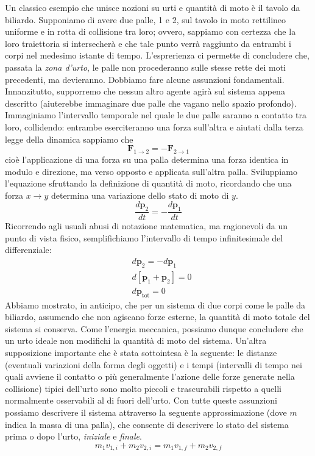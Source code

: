 Un classico esempio che unisce nozioni su urti e quantità di moto è il
tavolo da biliardo. Supponiamo di avere due palle, 1 e 2, sul tavolo in moto
rettilineo
uniforme e in rotta di collisione tra loro; ovvero, sappiamo con certezza
che la loro traiettoria si intersecherà e che tale punto verrà raggiunto
da entrambi i corpi nel medesimo istante di tempo. L'esprerienza ci permette
di concludere che, passata la \textit{zona d'urto}, le palle non procederanno
sulle stesse rette dei moti precedenti, ma devieranno.
Dobbiamo fare alcune assunzioni fondamentali. Innanzitutto, supporremo che
nessun altro agente agirà sul sistema appena descritto (aiuterebbe immaginare
due palle che vagano nello spazio profondo).
Immaginiamo l'intervallo temporale nel quale le due palle saranno a contatto
tra loro, collidendo: entrambe eserciteranno una forza sull'altra e aiutati
dalla terza legge della dinamica sappiamo che
\[ \textbf{F}_{1 \to 2} = -\textbf{F}_{2 \to 1} \]
cioè l'applicazione di una forza su una palla determina una forza identica
in modulo e direzione, ma verso opposto e applicata sull'altra palla.
Sviluppiamo l'equazione sfruttando la definizione di quantità di moto,
ricordando che una forza $x \to y$ determina una variazione dello stato di
moto di $y$.
\[ \frac{d\mathbf{p}_2}{dt} = -\frac{d\mathbf{p}_1}{dt} \]
Ricorrendo agli usuali abusi di notazione matematica, ma ragionevoli da
un punto di vista fisico, semplifichiamo l'intervallo di tempo infinitesimale
del differenziale:
\begin{align*}
    &d\mathbf{p}_2 = -d\mathbf{p}_1\\
    &d[\mathbf{p}_1 + \mathbf{p}_2] = 0\\
    &d\mathbf{p}_\text{tot} = 0
\end{align*}
Abbiamo mostrato, in anticipo, che per un sistema di due corpi come le palle
da biliardo, assumendo che non agiscano forze esterne, la quantità di moto
totale del sistema si conserva. Come l'energia meccanica, possiamo dunque
concludere che un urto ideale non modifichi la quantità di moto del sistema.
Un'altra supposizione importante che è stata
sottointesa è la seguente: le distanze (eventuali variazioni della forma
degli oggetti) e i tempi (intervalli di tempo nei quali avviene il contatto
o più generalmente l'azione delle forze generate nella collisione) tipici dell'urto sono
molto piccoli e trascurabili rispetto a quelli normalmente osservabili al
di fuori dell'urto.
Con tutte queste assunzioni possiamo descrivere il
sistema attraverso la seguente approssimazione (dove $m$ indica la massa
di una palla), che consente di descrivere lo stato del sistema prima o
dopo l'urto, \textit{iniziale} e \textit{finale}.
\[ m_1v_{1,i} + m_2v_{2,i} = m_1v_{1,f} + m_2v_{2,f} \]

